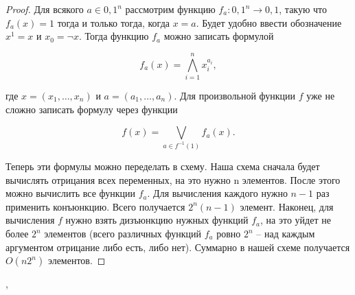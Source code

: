 \documentclass[a4paper,12pt]{article}
\begin{document}
        \begin{proof}
            Для всякого $a \in {0, 1}^n$ рассмотрим функцию $f_a : {0, 1}^n \rightarrow {0, 1}$,
            такую что $f_a(x) = 1$ тогда и только тогда, когда $x = a$. Будет удобно ввести обозначение $x^1 = x$ и $x_0 = \neg x$. Тогда функцию $f_a$ можно записать формулой
                
                    $$ f_a(x) = \bigwedge_{i = 1}^{n} x^{a_i}_i,$$
            
            где $x = (x_1, \ldots , x_n)$ и $a = (a_1, \ldots , a_n)$.
            Для произвольной функции $f$ уже не сложно записать формулу через функции
                
                $$ f(x) = \bigvee_{a \in f^{-1}(1)} f_a(x).$$

            Теперь эти формулы можно переделать в схему. Наша схема сначала будет вычислять отрицания всех переменных, на это нужно n элементов. После этого можно
            вычислить все функции $f_a$. Для вычисления каждого нужно $n - 1$ раз применить
            конъюнкцию. Всего получается $2^n(n -1)$ элемент. Наконец, для вычисления $f$ нужно взять дизъюнкцию нужных функций $f_a$, на это уйдет не более $2^n$ элементов (всего различных функций $f_a$ ровно $2^n$ -- над каждым аргументом отрицание либо есть, либо нет).
            Суммарно в нашей схеме получается $O(n2^n)$ элементов. 
        \end{proof}

    
    \sep
    
\end{document}
